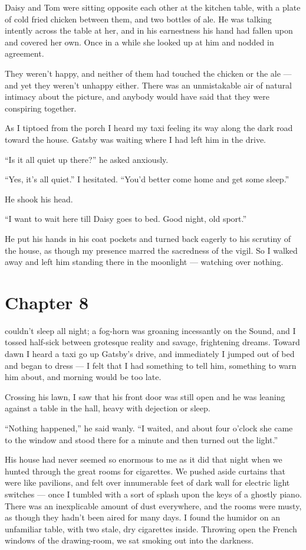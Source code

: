 \documentclass{znotebook}
\begin{document}
Daisy and Tom were sitting opposite each other at the kitchen table, with a plate of cold fried chicken between them, and two bottles of ale. He was talking intently across the table at her, and in his earnestness his hand had fallen upon and covered her own. Once in a while she looked up at him and nodded in agreement.

They weren't happy, and neither of them had touched the chicken or the ale — and yet they weren't unhappy either. There was an unmistakable air of natural intimacy about the picture, and anybody would have said that they were conspiring together.

As I tiptoed from the porch I heard my taxi feeling its way along the dark road toward the house. Gatsby was waiting where I had left him in the drive.

``Is it all quiet up there?'' he asked anxiously.

``Yes, it's all quiet.'' I hesitated. ``You'd better come home and get some sleep.''

He shook his head.

``I want to wait here till Daisy goes to bed. Good night, old sport.''

He put his hands in his coat pockets and turned back eagerly to his scrutiny of the house, as though my presence marred the sacredness of the vigil. So I walked away and left him standing there in the moonlight — watching over nothing.

\chapter{Chapter 8}

\lettrine[findent=2pt]{}{} couldn't sleep all night; a fog-horn was groaning incessantly on the Sound, and I tossed half-sick between grotesque reality and savage, frightening dreams. Toward dawn I heard a taxi go up Gatsby's drive, and immediately I jumped out of bed and began to dress — I felt that I had something to tell him, something to warn him about, and morning would be too late.

Crossing his lawn, I saw that his front door was still open and he was leaning against a table in the hall, heavy with dejection or sleep.

``Nothing happened,'' he said wanly. ``I waited, and about four o'clock she came to the window and stood there for a minute and then turned out the light.''

His house had never seemed so enormous to me as it did that night when we hunted through the great rooms for cigarettes. We pushed aside curtains that were like pavilions, and felt over innumerable feet of dark wall for electric light switches — once I tumbled with a sort of splash upon the keys of a ghostly piano. There was an inexplicable amount of dust everywhere, and the rooms were musty, as though they hadn't been aired for many days. I found the humidor on an unfamiliar table, with two stale, dry cigarettes inside. Throwing open the French windows of the drawing-room, we sat smoking out into the darkness.
\end{document}
